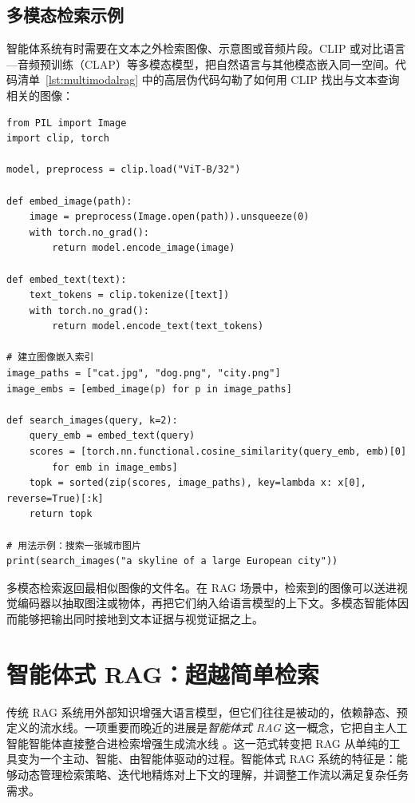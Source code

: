 \subsection{多模态检索示例}
智能体系统有时需要在文本之外检索图像、示意图或音频片段。CLIP 或对比语言—音频预训练（CLAP）等多模态模型，把自然语言与其他模态嵌入同一空间。代码清单~\ref{lst:multimodalrag} 中的高层伪代码勾勒了如何用 CLIP 找出与文本查询相关的图像：


\begin{listing}[!ht]
\begin{verbatim}
from PIL import Image
import clip, torch

model, preprocess = clip.load("ViT-B/32")

def embed_image(path):
    image = preprocess(Image.open(path)).unsqueeze(0)
    with torch.no_grad():
        return model.encode_image(image)

def embed_text(text):
    text_tokens = clip.tokenize([text])
    with torch.no_grad():
        return model.encode_text(text_tokens)

# 建立图像嵌入索引
image_paths = ["cat.jpg", "dog.png", "city.png"]
image_embs = [embed_image(p) for p in image_paths]

def search_images(query, k=2):
    query_emb = embed_text(query)
    scores = [torch.nn.functional.cosine_similarity(query_emb, emb)[0] 
        for emb in image_embs]
    topk = sorted(zip(scores, image_paths), key=lambda x: x[0], reverse=True)[:k]
    return topk

# 用法示例：搜索一张城市图片
print(search_images("a skyline of a large European city"))
\end{verbatim}
\caption{在 Python 中用 CLIP 查找相关图像的示例}
\label{lst:multimodalrag}
\end{listing}

多模态检索返回最相似图像的文件名。在 RAG 场景中，检索到的图像可以送进视觉编码器以抽取图注或物体，再把它们纳入给语言模型的上下文。多模态智能体因而能够把输出同时接地到文本证据与视觉证据之上。



\section{智能体式 RAG：超越简单检索}
\label{sec:agentic_rag}

传统 RAG 系统用外部知识增强大语言模型，但它们往往是被动的，依赖静态、预定义的流水线。一项重要而晚近的进展是\textit{智能体式 RAG} 这一概念，它把自主人工智能智能体直接整合进检索增强生成流水线 \citep{singh2025agentic}。这一范式转变把 RAG 从单纯的工具变为一个主动、智能、由智能体驱动的过程。智能体式 RAG 系统的特征是：能够动态管理检索策略、迭代地精炼对上下文的理解，并调整工作流以满足复杂任务需求。


